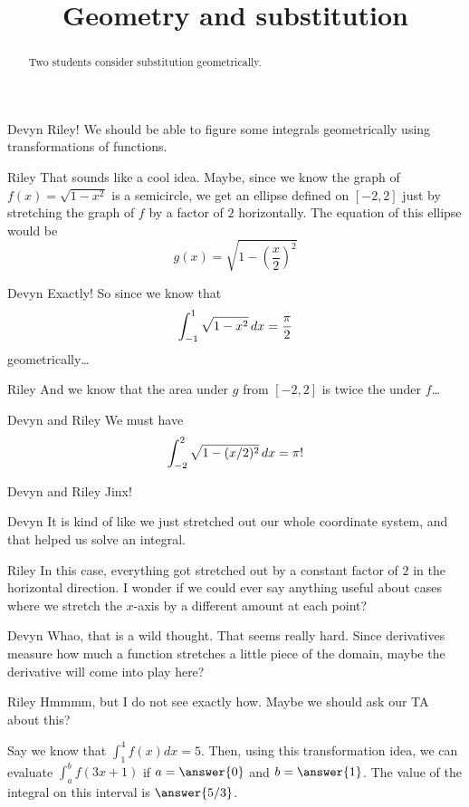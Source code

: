 \documentclass{ximera}
\title[Break-Ground:]{Geometry and substitution}
\begin{document}
\begin{abstract}
Two students consider substitution geometrically.
\end{abstract}
\maketitle

\begin{dialogue}
\item[Devyn] Riley! We should be able to figure some integrals
  geometrically using transformations of functions.
\item[Riley] That sounds like a cool idea.  Maybe, since we know the
  graph of $f(x) = \sqrt{1-x^2}$ is a semicircle, we get an ellipse
  defined on $[-2,2]$ just by stretching the graph of $f$ by a factor
  of $2$ horizontally.  The equation of this ellipse would be
  \[
  g(x) =\sqrt{1-(\frac{x}{2})^2}
  \]
\item[Devyn] Exactly!  So since we know that
  \[
  \int_{-1}^1 \sqrt{1-x^2} \,d x = \frac{\pi}{2}
  \]
  geometrically\dots
\item[Riley] And we know that the area under $g$ from $[-2,2]$ is
  twice the under $f$\dots
\item[Devyn and Riley] We must have
  \[
  \int_{-2}^2 \sqrt{1-(x/2)^2} \,d x =\pi !
  \]
\item[Devyn and Riley] Jinx!
\item[Devyn] It is kind of like we just stretched out our whole
  coordinate system, and that helped us solve an integral.
\item[Riley] In this case, everything got stretched out by a constant
  factor of $2$ in the horizontal direction.  I wonder if we could
  ever say anything useful about cases where we stretch the $x$-axis
  by a different amount at each point?
\item[Devyn] Whao, that is a wild thought.  That seems really hard.
  Since derivatives measure how much a function stretches a little
  piece of the domain, maybe the derivative will come into play here?
\item[Riley] Hmmmm, but I do not see exactly how.  Maybe we should ask
  our TA about this?
\end{dialogue}


\begin{question}
Say we know that $\int_1^4 f(x) dx = 5$.  Then, using this transformation idea, we can evaluate $\int_a^b f(3x+1)$ if $a= \answer{0}$ and $b=\answer{1}$.  The value of the integral on this interval is $\answer{5/3}$.
\end{question}


\end{document}
